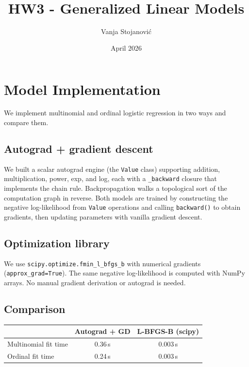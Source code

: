 \documentclass[10pt, a4paper]{article}
\title{\textbf{HW3 - Generalized Linear Models}}
\author{Vanja Stojanovi\'c}
\date{April 2026}
\begin{document}
\maketitle

\section{Model Implementation}

We implement multinomial and ordinal logistic regression in two ways and compare them.

\subsection{Autograd + gradient descent}

We built a scalar autograd engine (the \texttt{Value} class) supporting addition, multiplication, power, exp, and log, each with a \texttt{\_backward} closure that implements the chain rule. Backpropagation walks a topological sort of the computation graph in reverse. Both models are trained by constructing the negative log-likelihood from \texttt{Value} operations and calling \texttt{backward()} to obtain gradients, then updating parameters with vanilla gradient descent.

\subsection{Optimization library}

We use \texttt{scipy.optimize.fmin\_l\_bfgs\_b} with numerical gradients (\texttt{approx\_grad=True}). The same negative log-likelihood is computed with NumPy arrays. No manual gradient derivation or autograd is needed.

\subsection{Comparison}

\begin{table}[h]
\centering
\begin{tabular}{lcc}
\toprule
 & Autograd + GD & L-BFGS-B (scipy) \\
\midrule
Multinomial fit time & 0.36\,s & 0.003\,s \\
Ordinal fit time     & 0.24\,s & 0.003\,s \\
\bottomrule
\end{tabular}
\end{table}
\end{document}
